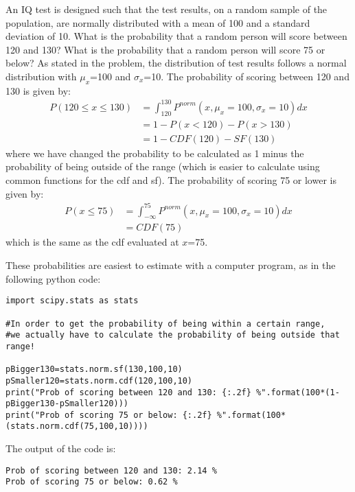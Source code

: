 \clearpage
\begin{example}{}{An IQ test is designed such that the test results, on a random sample of the population, are normally distributed with a mean of 100 and a standard deviation of 10. What is the probability that a random person will score between 120 and 130? What is the probability that a random person will score 75 or below?}{}
As stated in the problem, the distribution of test results follows a normal distribution with $\mu_x$=100 and $\sigma_x$=10. The probability of scoring between 120 and 130 is given by:
\begin{align*}
P(120 \leq x \leq 130)&=\int_{120}^{130}P^{norm}(x,\mu_x=100,\sigma_x=10)dx\\
&=1-P(x < 120)-P(x > 130)\\
&=1-CDF(120)-SF(130)
\end{align*}
where we have changed the probability to be calculated as 1 minus the probability of being outside of the range (which is easier to calculate using common functions for the cdf and sf). The probability of scoring 75 or lower is given by:
\begin{align*}
P(x \leq 75)&=\int_{-\infty}^{75}P^{norm}(x,\mu_x=100,\sigma_x=10)dx\\
&=CDF(75)
\end{align*}
which is the same as the cdf evaluated at $x$=75. 

These probabilities are easiest to estimate with a computer program, as in the following python code:
\begin{lstlisting}[frame=single] 
import scipy.stats as stats

#In order to get the probability of being within a certain range,
#we actually have to calculate the probability of being outside that range!

pBigger130=stats.norm.sf(130,100,10)
pSmaller120=stats.norm.cdf(120,100,10)
print("Prob of scoring between 120 and 130: {:.2f} %".format(100*(1-pBigger130-pSmaller120)))
print("Prob of scoring 75 or below: {:.2f} %".format(100*(stats.norm.cdf(75,100,10))))
\end{lstlisting}
The output of the code is:
\begin{verbatim}
Prob of scoring between 120 and 130: 2.14 %
Prob of scoring 75 or below: 0.62 %
\end{verbatim}
\end{example}

